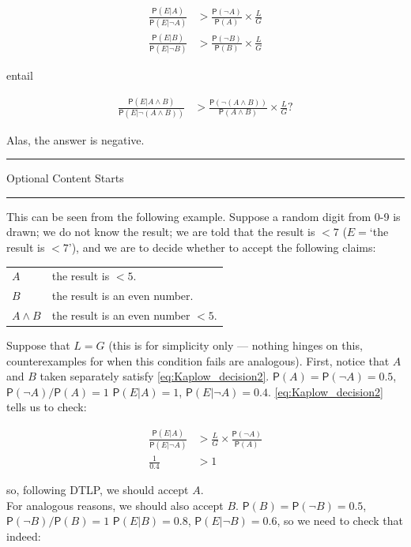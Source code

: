 \documentclass[10pt,dvipsnames,enabledeprecatedfontcommands]{scrartcl}
\newcommand{\n}{\neg}
\newcommand{\et}{\wedge}
\newcommand{\pr}[1]{\mathsf{P}(#1)}
\newcommand{\intermezzoa}{
	\begin{minipage}[c]{13cm}
	\begin{center}\rule{10cm}{0.4pt}



	\tiny{\sc Optional Content Starts}
	
	\vspace{-1mm}
	
	\rule{10cm}{0.4pt}\end{center}
	\end{minipage}\nopagebreak 
	}
\begin{document}
\begin{align*}
 \frac{\pr{E\vert A}}{\pr{E\vert \n A}}  & > \frac{\pr{\n A}}{\pr{A}} \times \frac{L}{G}\\
 \frac{\pr{E\vert B}}{\pr{E\vert \n B}}  & > \frac{\pr{\n B}}{\pr{B}} \times \frac{L}{G}
 \end{align*}

\noindent entail

\begin{align*}
 \frac{\pr{E\vert A\et B}}{\pr{E\vert \n (A\et B)}}  & > \frac{\pr{\n (A\et B)}}{
 \pr{A\et B}} \times \frac{L}{G}?
 \end{align*}

Alas, the answer is negative.

\intermezzoa

This can be seen from the following example. Suppose a random digit from
0-9 is drawn; we do not know the result; we are told that the result is
\(<7\) (\(E=\)`the result is \(<7\)'), and we are to decide whether to
accept the following claims:

\begin{center}
 \begin{tabular}{@{}ll@{}}
 \toprule
 $A$ & the result is $<5$. \\
 $B$  & the result is an even number.\\
 $A\et B$ & the result is an even number $<5$. \\
 \bottomrule
 \end{tabular}
 \end{center}

Suppose that \(L=G\) (this is for simplicity only --- nothing hinges on
this, counterexamples for when this condition fails are analogous).
First, notice that \(A\) and \(B\) taken separately satisfy
\eqref{eq:Kaplow_decision2}. \(\pr{A}=\pr{\n A}=0.5\),
\(\pr{\n A}/\pr{A}=1\) \(\pr{E\vert A}=1\), \(\pr{E\vert \n A}=0.4\).
\eqref{eq:Kaplow_decision2} tells us to check:

\begin{align*}
 \frac{\pr{E\vert A}}{\pr{E\vert \n A}}&> \frac{L}{G}\times \frac{\pr{\n A}}{\pr{A}}\\
 \frac{1}{0.4} & > 1
 \end{align*}

\noindent so, following DTLP, we should accept \(A\).\\
For analogous reasons, we should also accept \(B\).
\(\pr{B}=\pr{\n B}=0.5\), \(\pr{\n B}/\pr{B}=1\) \(\pr{E\vert B}=0.8\),
\(\pr{E\vert \n B}=0.6\), so we need to check that indeed:
\end{document}
